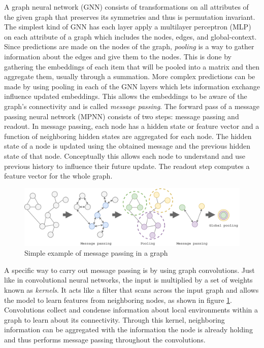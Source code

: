 \documentclass[12pt, abstract = true]{scrartcl}
\begin{document}
A graph neural network (GNN) consists of transformations on all attributes of the given graph 
that preserves its symmetries and thus is permutation invariant. The simplest kind of GNN has 
each layer apply a multilayer perceptron (MLP) on each attribute of a graph which includes the
nodes, edges, and global-context. Since predictions are made on the nodes of the graph, \emph{pooling} 
is a way to gather information about the edges and give them to the nodes. This is done by 
gathering the embeddings of each item that will be pooled into a matrix and then aggregate them, 
usually through a summation. More complex predictions can be made by using pooling 
in each of the GNN layers which lets information exchange influence updated embeddings. This 
allows the embeddings to be aware of the graph's connectivity and is called \emph{message passing}. 
The forward pass of a message passing neural network (MPNN) consists of two steps: message passing 
and readout. In message passing, each node has a hidden state or feature vector and a function of 
neighboring hidden states are aggregated for each node. The hidden state of a node is updated using 
the obtained message and the previous hidden state of that node. Conceptually this allows each node 
to understand and use previous history to influence their future update. The readout step computes 
a feature vector for the whole graph.

\begin{figure}
  \centering
  \includegraphics[scale=.75]{mpnn.png}
  
  \caption{Simple example of message passing in a graph}\label{fig:mpnn}
\end{figure}

A specific way to carry out message passing is by using graph convolutions. Just like in convolutional 
neural networks, the input is multiplied by a set of weights known as \emph{kernels}. It acts like a 
filter that scans across the input graph and allows the model to learn features from neighboring nodes, as shown in figure \ref{fig:mpnn}.
Convolutions collect and condense information about local environments within a graph to learn about 
its connectivity. Through this kernel, neighboring information can be aggregated with the information 
the node is already holding and thus performs message passing throughout the convolutions.
\end{document}
